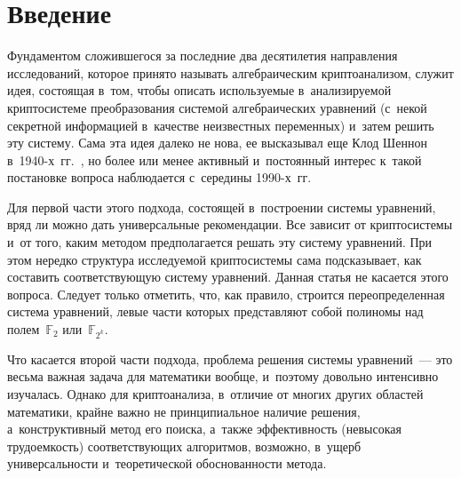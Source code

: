 

  
\vspace*{9pt}



\thispagestyle{headings}

\begin{multicols}{2}

\label{st\stat}


\section{Введение}

Фундаментом сложившегося за последние два десятилетия направления исследований, 
которое принято называть алгебраическим криптоанализом, служит идея, состоящая 
в~том, чтобы описать используемые в~анализируемой криптосистеме преобразования 
системой алгебраических уравнений (с~некой секретной информацией в~качестве 
неизвестных переменных) и~затем решить эту сис\-те\-му.
Сама эта идея далеко не нова, ее высказывал еще Клод Шеннон 
в~1940-х~гг.~\cite{Shannon1949}, но более или менее активный и~постоянный интерес 
к~такой постановке вопроса наблюдается с~середины 1990-х~гг.

Для первой части этого подхода, состоящей в~построении системы уравнений, вряд 
ли можно дать универсальные рекомендации. Все зависит от крип\-то\-сис\-те\-мы и~от 
того, каким методом предполагается решать эту систему уравнений.
При этом нередко структура исследуемой криптосистемы сама подсказывает, как 
составить соответствующую систему уравнений.
Данная статья не касается этого вопроса.
Следует только отметить, что, как правило, строится переопределенная система 
уравнений, левые части которых представляют собой полиномы над полем~$\mathbb{F}_2$ 
или~$\mathbb{F}_{2^k}$.

Что касается второй части подхода, проблема решения системы уравнений~--- это 
весьма важная задача для математики вообще, и~поэтому довольно интенсивно 
изучалась.
Однако для криптоанализа, в~отличие от многих других областей математики, крайне 
важно не принципиальное наличие решения, а~конструктивный метод его поиска, 
а~также эффективность (невысокая трудоемкость) соответствующих алгоритмов, 
возможно, в~ущерб универсальности и~теоретической обоснованности ме\-тода.




\end{multicols}
